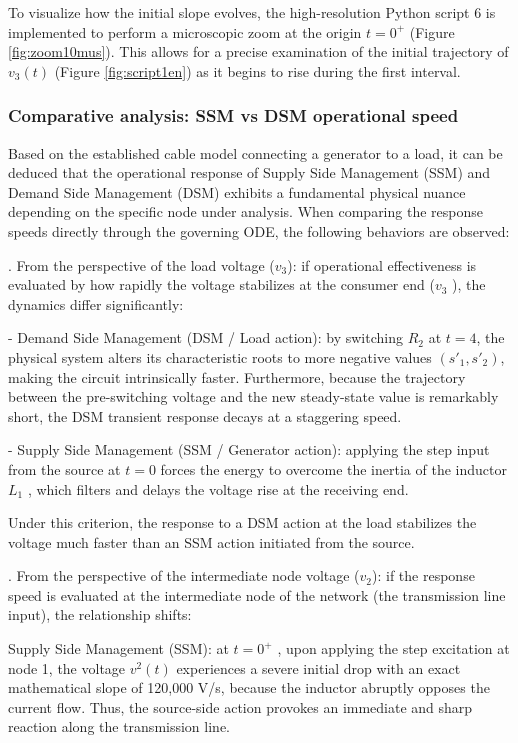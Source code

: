 \documentclass[11pt, a4paper]{article}
\begin{document}
To visualize how the initial slope evolves, the high-resolution Python script 6 is implemented to perform a microscopic  zoom at the origin $t = 0^+$ (Figure \ref{fig:zoom10mus}). This allows for a precise examination of the initial trajectory of $v_3 (t)$ (Figure \ref{fig:script1en}) as it begins to rise during the first interval.


\subsubsection*{Comparative analysis: SSM vs DSM operational speed}

Based on the established cable model connecting a generator to a load, it can be deduced that the operational response of Supply Side Management (SSM) and Demand Side Management (DSM) exhibits a fundamental physical nuance depending on the specific node under analysis. When comparing the response speeds directly through the governing ODE, the following behaviors are observed:


\medskip{}. From the perspective of the load voltage ($v_3$): if operational effectiveness is evaluated by how rapidly the voltage stabilizes at the consumer end ($v_3$ ), the dynamics differ significantly:

\medskip
- Demand Side Management (DSM / Load action): by switching $R_2$ at $t = 4$,
the physical system alters its characteristic roots to more negative values
$(s'_1 , s'_2)$, making the circuit intrinsically faster. Furthermore, because the trajectory between the pre-switching voltage and the new steady-state value is remarkably short, the DSM transient response decays at a staggering speed.

\medskip
- Supply Side Management (SSM / Generator action): applying the step input
from the source at $t = 0$ forces the energy to overcome the inertia of the
inductor $L_1$ , which filters and delays the voltage rise at the receiving end.

Under this criterion, the response to a DSM action at the load stabilizes the voltage much faster than an SSM action initiated from the source.

\medskip{}. From the perspective of the intermediate node voltage ($v_2$): if the response speed is evaluated at the intermediate node of the network (the transmission line input), the relationship shifts:

\medskip
Supply Side Management (SSM): at $t = 0^+$ , upon applying the step excitation
at node 1, the voltage $v^2(t)$ experiences a severe initial drop with an exact
mathematical slope of 120,000 V\!/s, because the inductor abruptly opposes
the current flow. Thus, the source-side action provokes an immediate and
sharp reaction along the transmission line.
\end{document}
